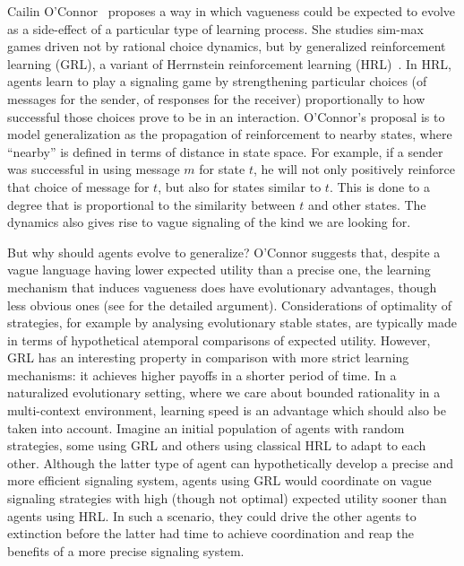 \documentclass[a4paper]{article}
\begin{document}
Cailin O'Connor~\parencite*{oconnor_evolution_2014} proposes a way in which vagueness could be expected to evolve as a side-effect of a particular type of learning process.
She studies sim-max games driven not by rational choice dynamics, but by generalized reinforcement learning (GRL), a variant of Herrnstein reinforcement learning (HRL)~\parencite{roth_learning_1995}.
In HRL, agents learn to play a signaling game by strengthening particular choices (of messages for the sender, of responses for the receiver) proportionally to how successful those choices prove to be in an interaction.
O'Connor's proposal is to model generalization as the propagation of reinforcement to nearby states, where ``nearby'' is defined in terms of distance in state space.
For example, if a sender was successful in using message $m$ for state $t$, he will not only positively reinforce that choice of message for $t$, but also for states similar to $t$.
This is done to a degree that is proportional to the similarity between $t$ and other states.
The dynamics also gives rise to vague signaling of the kind we are looking for.

But why should agents evolve to generalize?
O'Connor suggests that, despite a vague language having lower expected utility than a precise one, the learning mechanism that induces vagueness does have evolutionary advantages, though less obvious ones (see \textcite{oconnor_evolving_2015} for the detailed argument).
Considerations of optimality of strategies, for example by analysing evolutionary stable states, are typically made in terms of hypothetical atemporal comparisons of expected utility.
However, GRL has an interesting property in comparison with more strict learning mechanisms: it achieves higher payoffs in a shorter period of time.
In a naturalized evolutionary setting, where we care about bounded rationality in a multi-context environment, learning speed is an advantage which should also be taken into account.
Imagine an initial population of agents with random strategies, some using GRL and others using classical HRL to adapt to each other.
Although the latter type of agent can hypothetically develop a precise and more efficient signaling system, agents using GRL would coordinate on vague signaling strategies with high (though not optimal) expected utility sooner than agents using HRL.
In such a scenario, they could drive the other agents to extinction before the latter had time to achieve coordination and reap the benefits of a more precise signaling system.
\end{document}
